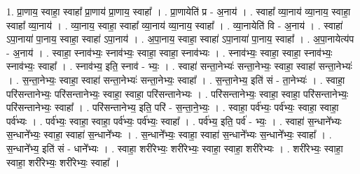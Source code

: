 \documentclass[17pt]{extarticle}
\begin{document}
1. प्रा॒णाय॒ स्वाहा॒ स्वाहा᳚ प्रा॒णाय॑ प्रा॒णाय॒ स्वाहा᳚ । . प्रा॒णायेति॑ प्र - अ॒नाय॑ । . स्वाहा᳚ व्या॒नाय॑ व्या॒नाय॒ स्वाहा॒ स्वाहा᳚ व्या॒नाय॑ । . व्या॒नाय॒ स्वाहा॒ स्वाहा᳚ व्या॒नाय॑ व्या॒नाय॒ स्वाहा᳚ । . व्या॒नायेति॑ वि - अ॒नाय॑ । . स्वाहा॑ ऽपा॒नाया॑ पा॒नाय॒ स्वाहा॒ स्वाहा॑ ऽपा॒नाय॑ । . अ॒पा॒नाय॒ स्वाहा॒ स्वाहा॑ ऽपा॒नाया॑ पा॒नाय॒ स्वाहा᳚ । . अ॒पा॒नायेत्य॑प - अ॒नाय॑ । . स्वाहा॒ स्नाव॑भ्यः॒ स्नाव॑भ्यः॒ स्वाहा॒ स्वाहा॒ स्नाव॑भ्यः । . स्नाव॑भ्यः॒ स्वाहा॒ स्वाहा॒ स्नाव॑भ्यः॒ स्नाव॑भ्यः॒ स्वाहा᳚ । . स्नाव॑भ्य॒ इति॒ स्नाव॑ - भ्यः॒ । . स्वाहा॑ सन्ता॒नेभ्यः॑ सन्ता॒नेभ्यः॒ स्वाहा॒ स्वाहा॑ सन्ता॒नेभ्यः॑ । . स॒न्ता॒नेभ्यः॒ स्वाहा॒ स्वाहा॑ सन्ता॒नेभ्यः॑ सन्ता॒नेभ्यः॒ स्वाहा᳚ । . स॒न्ता॒नेभ्य॒ इति॑ सं - ता॒नेभ्यः॑ । . स्वाहा॒ परि॑सन्तानेभ्यः॒ परि॑सन्तानेभ्यः॒ स्वाहा॒ स्वाहा॒ परि॑सन्तानेभ्यः । . परि॑सन्तानेभ्यः॒ स्वाहा॒ स्वाहा॒ परि॑सन्तानेभ्यः॒ परि॑सन्तानेभ्यः॒ स्वाहा᳚ । . परि॑सन्तानेभ्य॒ इति॒ परि॑ - स॒न्ता॒ने॒भ्यः॒ । . स्वाहा॒ पर्व॑भ्यः॒ पर्व॑भ्यः॒ स्वाहा॒ स्वाहा॒ पर्व॑भ्यः । . पर्व॑भ्यः॒ स्वाहा॒ स्वाहा॒ पर्व॑भ्यः॒ पर्व॑भ्यः॒ स्वाहा᳚ । . पर्व॑भ्य॒ इति॒ पर्व॑ - भ्यः॒ । . स्वाहा॑ स॒न्धाने᳚भ्यः स॒न्धाने᳚भ्यः॒ स्वाहा॒ स्वाहा॑ स॒न्धाने᳚भ्यः । . स॒न्धाने᳚भ्यः॒ स्वाहा॒ स्वाहा॑ स॒न्धाने᳚भ्यः स॒न्धाने᳚भ्यः॒ स्वाहा᳚ । . स॒न्धाने᳚भ्य॒ इति॑ सं - धाने᳚भ्यः । . स्वाहा॒ शरी॑रेभ्यः॒ शरी॑रेभ्यः॒ स्वाहा॒ स्वाहा॒ शरी॑रेभ्यः । . शरी॑रेभ्यः॒ स्वाहा॒ स्वाहा॒ शरी॑रेभ्यः॒ शरी॑रेभ्यः॒ स्वाहा᳚ । \newline
\end{document}
